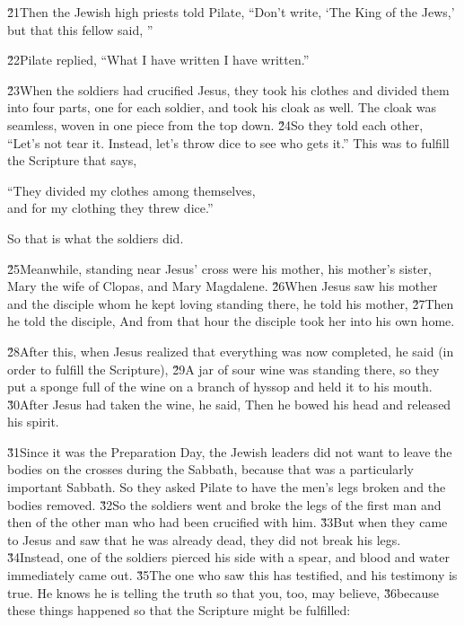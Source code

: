 \v{21}Then the Jewish high priests told Pilate, ``Don't write, `The King of the Jews,' but that this fellow said, ''

\v{22}Pilate replied, ``What I have written I have written.''

\v{23}When the soldiers had crucified Jesus, they took his clothes and divided them into four parts, one for each soldier, and took his cloak as well. The cloak was seamless, woven in one piece from the top down. \v{24}So they told each other, ``Let's not tear it. Instead, let's throw dice to see who gets it.'' This was to fulfill the Scripture that says,

\begin{poetry}
\poeml ``They divided my clothes among themselves, \\
\poemll    and for my clothing they threw dice.''
\end{poetry}

So that is what the soldiers did.

\v{25}Meanwhile, standing near Jesus' cross were his mother, his mother's sister, Mary the wife of Clopas, and Mary Magdalene. \v{26}When Jesus saw his mother and the disciple whom he kept loving standing there, he told his mother,  \v{27}Then he told the disciple,  And from that hour the disciple took her into his own home.

\v{28}After this, when Jesus realized that everything was now completed, he said (in order to fulfill the Scripture),  \v{29}A jar of sour wine was standing there, so they put a sponge full of the wine on a branch of hyssop and held it to his mouth. \v{30}After Jesus had taken the wine, he said,  Then he bowed his head and released his spirit.

\v{31}Since it was the Preparation Day, the Jewish leaders did not want to leave the bodies on the crosses during the Sabbath, because that was a particularly important Sabbath. So they asked Pilate to have the men's legs broken and the bodies removed. \v{32}So the soldiers went and broke the legs of the first man and then of the other man who had been crucified with him. \v{33}But when they came to Jesus and saw that he was already dead, they did not break his legs. \v{34}Instead, one of the soldiers pierced his side with a spear, and blood and water immediately came out. \v{35}The one who saw this has testified, and his testimony is true. He knows he is telling the truth so that you, too, may believe, \v{36}because these things happened so that the Scripture might be fulfilled:

